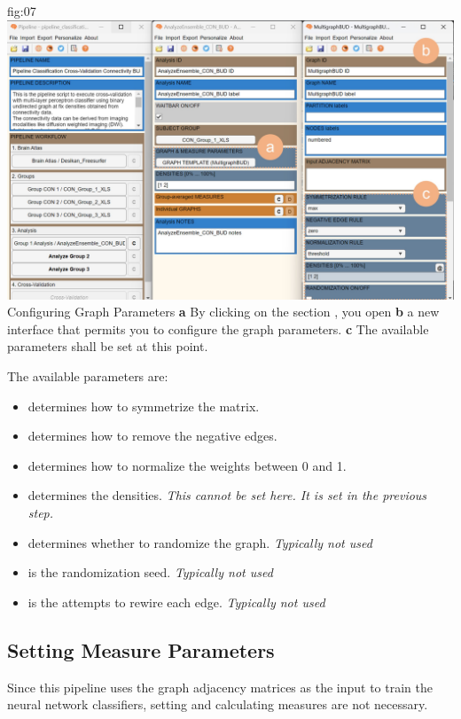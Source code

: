 \documentclass[justified]{tufte-handout}
\begin{document}
{
	{fig:07}
	{
	\includegraphics{fig07.jpg}
	}
	{Configuring Graph Parameters}
	{
	{\bf a} By clicking on the section , you open {\bf b} a new interface that permits you to configure the graph parameters.
	{\bf c} The available parameters shall be set at this point.
	}

The available parameters are:
\begin{itemize}
	\item {} determines how to symmetrize the matrix.
	\item {} determines how to remove the negative edges.
	\item {} determines how to normalize the weights between 0 and 1.
	\item {} determines the densities. \emph{This cannot be set here. It is set in the previous step.}
	\item {} determines whether to randomize the graph. \emph{Typically not used}
	\item {} is the randomization seed. \emph{Typically not used}
	\item {} is the attempts to rewire each edge. \emph{Typically not used}
\end{itemize}

\subsection{Setting Measure Parameters}

Since this pipeline uses the graph adjacency matrices as the input to train the neural network classifiers, setting and calculating measures are not necessary.

}
\end{document}
